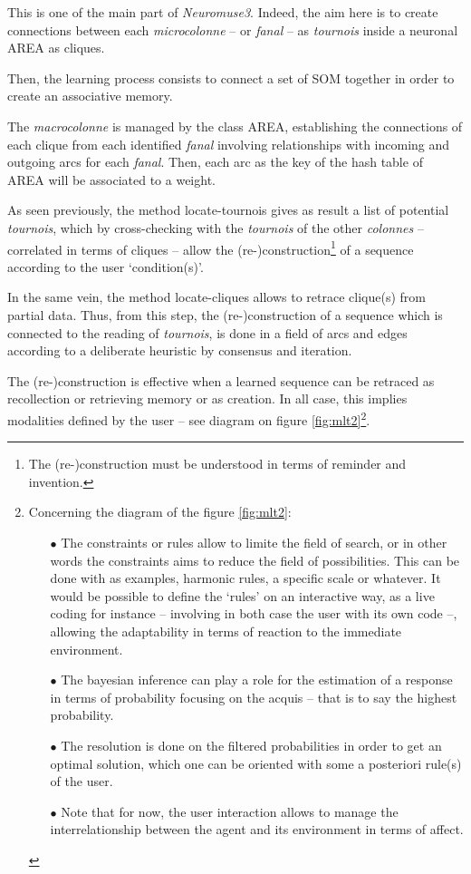 This is one of the main part of \textsl{Neuromuse3}. Indeed, the aim here is to create connections between each \textit{microcolonne} -- or \textit{fanal} -- as \textit{tournois} inside a neuronal AREA as cliques. 

Then, the learning process consists to connect a set of SOM together in order to create an associative memory.

\bigskip

The \textit{macrocolonne} is managed by the class AREA, establishing the connections of each clique from each identified \textit{fanal} involving relationships with incoming and outgoing arcs for each \textit{fanal}. Then, each arc as the key of the hash table of AREA will be associated to a weight.


\bigskip

As seen previously, the method  \glspl{locate-tournoi} gives as result a list of potential  \textit{tournois}, which by cross-checking with the \textit{tournois} of the other \textit{colonnes} -- correlated  in terms of cliques -- allow the (re-)construction\footnote{The (re-)construction must be understood in terms of reminder and invention.} of a sequence according to the user `condition(s)'. 

\smallskip

In the same vein, the method \glspl{locate-clique} allows to retrace clique(s) from partial data. Thus, from this step, the (re-)construction of a sequence which is connected to the reading of \textit{tournois}, is done in a field of arcs and edges according to a deliberate heuristic by consensus and iteration.

\smallskip

The (re-)construction is effective when a learned sequence can be retraced as recollection or retrieving memory or as creation. In all case, this implies modalities defined by the user -- see diagram on figure \ref{fig:mlt2}\footnote{Concerning the diagram of the figure \ref{fig:mlt2}:
\begin{itemize}
\item[$\bullet$]  The constraints or rules allow to limite the field of search, or in other words the constraints aims to reduce the field of possibilities. This can be done with as examples, harmonic rules, a specific scale or whatever. It would be possible to define the `rules' on an interactive way, as a live coding for instance -- involving  in both case the user with its own code --, allowing the adaptability in terms of reaction to the immediate environment.
\item[$\bullet$]  The bayesian inference can play a role for the estimation of a response in terms of probability focusing on the acquis -- that is to say the highest probability.
\item[$\bullet$]  The resolution is done on the filtered probabilities in order to get an optimal solution, which one can be oriented with some a posteriori rule(s) of the user. 
\item[$\bullet$] Note that for now, the user interaction allows to manage the interrelationship between the agent and its environment in terms of affect.
\end{itemize}}.

